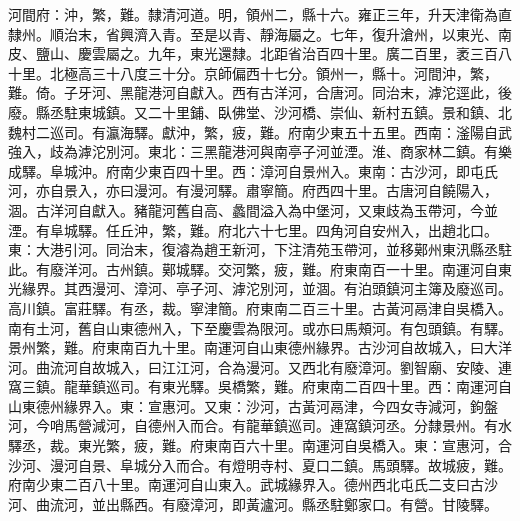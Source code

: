 \begin{pinyinscope}
河間府：沖，繁，難。隸清河道。明，領州二，縣十六。雍正三年，升天津衛為直隸州。順治末，省興濟入青。至是以青、靜海屬之。七年，復升滄州，以東光、南皮、鹽山、慶雲屬之。九年，東光還隸。北距省治百四十里。廣二百里，袤三百八十里。北極高三十八度三十分。京師偏西十七分。領州一，縣十。河間沖，繁，難。倚。子牙河、黑龍港河自獻入。西有古洋河，合唐河。同治末，滹沱逕此，後廢。縣丞駐東城鎮。又二十里鋪、臥佛堂、沙河橋、崇仙、新村五鎮。景和鎮、北魏村二巡司。有瀛海驛。獻沖，繁，疲，難。府南少東五十五里。西南：滏陽自武強入，歧為滹沱別河。東北：三黑龍港河與南亭子河並湮。淮、商家林二鎮。有樂成驛。阜城沖。府南少東百四十里。西：漳河自景州入。東南：古沙河，即屯氏河，亦自景入，亦曰漫河。有漫河驛。肅寧簡。府西四十里。古唐河自饒陽入，涸。古洋河自獻入。豬龍河舊自高、蠡間溢入為中堡河，又東歧為玉帶河，今並湮。有阜城驛。任丘沖，繁，難。府北六十七里。四角河自安州入，出趙北口。東：大港引河。同治末，復濬為趙王新河，下注清苑玉帶河，並移鄚州東汛縣丞駐此。有廢洋河。古州鎮。鄚城驛。交河繁，疲，難。府東南百一十里。南運河自東光緣界。其西漫河、漳河、亭子河、滹沱別河，並涸。有泊頭鎮河主簿及廢巡司。高川鎮。富莊驛。有丞，裁。寧津簡。府東南二百三十里。古黃河鬲津自吳橋入。南有土河，舊自山東德州入，下至慶雲為限河。或亦曰馬頰河。有包頭鎮。有驛。景州繁，難。府東南百九十里。南運河自山東德州緣界。古沙河自故城入，曰大洋河。曲流河自故城入，曰江江河，合為漫河。又西北有廢漳河。劉智廟、安陵、連窩三鎮。龍華鎮巡司。有東光驛。吳橋繁，難。府東南二百四十里。西：南運河自山東德州緣界入。東：宣惠河。又東：沙河，古黃河鬲津，今四女寺減河，鉤盤河，今哨馬營減河，自德州入而合。有龍華鎮巡司。連窩鎮河丞。分隸景州。有水驛丞，裁。東光繁，疲，難。府東南百六十里。南運河自吳橋入。東：宣惠河，合沙河、漫河自景、阜城分入而合。有燈明寺村、夏口二鎮。馬頭驛。故城疲，難。府南少東二百八十里。南運河自山東入。武城緣界入。德州西北屯氏二支曰古沙河、曲流河，並出縣西。有廢漳河，即黃瀘河。縣丞駐鄭家口。有營。甘陵驛。


\end{pinyinscope}
